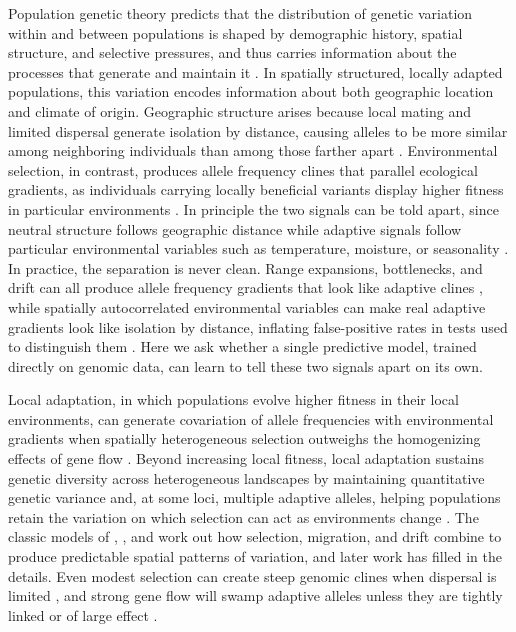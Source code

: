 \documentclass[]{article}
\begin{document}
Population genetic theory predicts that the distribution
of genetic variation within and between populations
is shaped by demographic history, spatial structure,
and selective pressures,
and thus carries information about the processes
that generate and maintain it
\citep{lewontin_genetic_1974, hartl_principles_1980, ellegren_determinants_2016}.
In spatially structured, locally adapted populations,
this variation encodes information about both geographic location
and climate of origin.
Geographic structure arises because local mating and limited dispersal
generate isolation by distance,
causing alleles to be more similar among neighboring individuals
than among those farther apart
\citep{wright_isolation_1943, slatkin_isolation_1993}.
Environmental selection, in contrast,
produces allele frequency clines that parallel ecological gradients,
as individuals carrying locally beneficial variants
display higher fitness in particular environments
\citep{endler1977geographic, clausen_experimental_1948, kawecki_conceptual_2004}.
In principle the two signals can be told apart,
since neutral structure follows geographic distance
while adaptive signals follow particular environmental
variables such as temperature, moisture, or seasonality
\citep{rellstab_practical_2015, hoban_finding_2016, tigano_genomics_2016, coop_using_2010}.
In practice, the separation is never clean.
Range expansions, bottlenecks, and drift
can all produce allele frequency gradients that look like adaptive clines
\citep{excoffier_genetic_2009, novembre_spatial_2009}, while spatially 
autocorrelated environmental variables can make real 
adaptive gradients look like isolation by distance, 
inflating false-positive rates in tests
used to distinguish them \citep[e.g.,][]{guillot_dismantling_2013,legendre_should_2015}.
Here we ask whether a single predictive model, trained directly on genomic
data, can learn to tell these two signals apart on its own.

Local adaptation, in which populations evolve higher fitness in their local environments, 
can generate covariation of allele frequencies with environmental gradients 
when spatially heterogeneous selection outweighs the homogenizing effects of gene flow
\citep{savolainen_ecological_2013, lenormand_gene_2002}.
Beyond increasing local fitness,
local adaptation sustains genetic diversity across heterogeneous landscapes
by maintaining quantitative genetic variance and, at some loci, multiple adaptive alleles,
helping populations retain the variation
on which selection can act as environments change \citep{hereford_quantitative_2009}.
The classic models of 
\citet{wright_isolation_1943}, 
\citet{levene_genetic_1953},
and 
\citet{endler1977geographic}
work out how selection, migration, and drift
combine to produce predictable spatial patterns of variation,
and later work has filled in the details.
Even modest selection can create steep genomic clines
when dispersal is limited
\citep{tigano_genomics_2016, yeaman_genetic_2011},
and strong gene flow will swamp adaptive alleles
unless they are tightly linked or of large effect
\citep{slatkin_gene_1975}.
\end{document}
